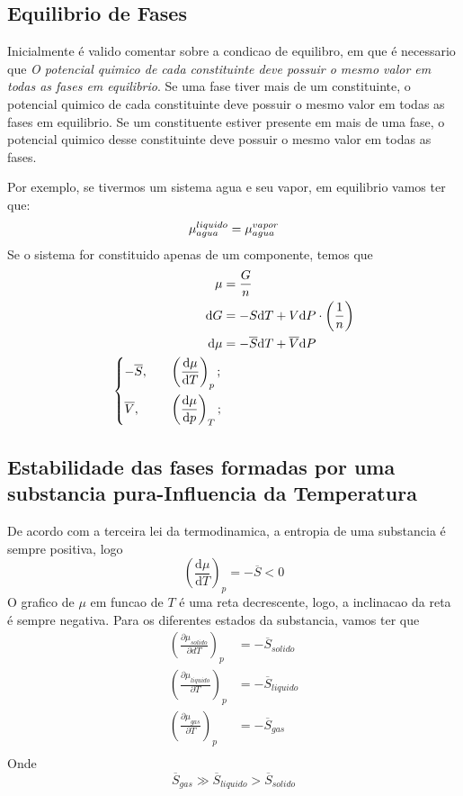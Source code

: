 \subsection{Equilibrio de Fases}
Inicialmente é valido comentar sobre a condicao de equilibro, em que é necessario que \emph{O
potencial quimico de cada constituinte deve possuir o mesmo valor em todas as fases em equilibrio}.
Se uma fase tiver mais de um constituinte, o potencial quimico de cada constituinte deve possuir o
mesmo valor em todas as fases em equilibrio. Se um constituente estiver presente em mais de uma
fase, o potencial quimico desse constituinte deve possuir o mesmo valor em todas as fases. \par

Por exemplo, se tivermos um sistema agua e seu vapor, em equilibrio vamos ter que:
\begin{equation}
    \mu_{agua}^{liquido} = \mu_{agua}^{vapor}\\
\end{equation}
Se o sistema for constituido apenas de um componente, temos que 
\begin{align}
    \mu &= \frac{G}{n}\\
    \mathrm{d}G &= - S\mathrm{d}T + V\mathrm{d}P \cdot \left( \frac{1}{n} \right)\\
    \mathrm{d}\mu  &= - \overline{S} \mathrm{d}T + \overline{V} \mathrm{d}P\\
    \begin{dcases}
    -\overline{S} , &\quad \left( \frac{\mathrm{d}\mu }{\mathrm{d}T}  \right)_{p}   ;\\
    \overline{V} , &\quad\left( \frac{\mathrm{d}\mu }{\mathrm{d}p}  \right) _{T} ;\\
    \end{dcases}
\end{align}
\subsection{Estabilidade das fases formadas por uma substancia pura-Influencia da Temperatura}
De acordo com a terceira lei da termodinamica, a entropia de uma substancia é sempre positiva, logo
\begin{equation}
    \left( \frac{\mathrm{d}\mu }{\mathrm{d}T}  \right) _{p} = -\overline{S} < 0
\end{equation}
O grafico de \(\mu \) em funcao de \(T\) é uma reta decrescente, logo, a inclinacao da reta é sempre
negativa. Para os diferentes estados da substancia, vamos ter que
\begin{align}
    \left(\frac{\partial \mu_{solido} }{\partial {d}T}\right)_{p} &= -\overline{S}_{solido} \\
    \left( \frac{\partial \mu_{liquido}}{\partial T}  \right)_{p} &= -\overline{S}_{liquido} \\ 
    \left( \frac{\partial \mu_{gas} }{\partial T}  \right)_{p} &= -\overline{S}_{gas} \\
\end{align}
Onde
\begin{equation}
    \overline{S}_{gas} \gg \overline{S}_{liquido} > \overline{S}_{solido}
\end{equation} 

